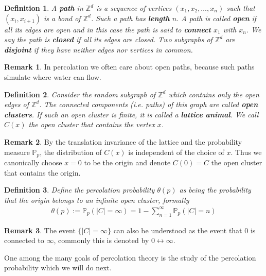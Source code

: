 \documentclass[12pt,a4paper]{article}
\newtheorem{defn}{Definition}[section]
\theoremstyle{definition}
\newtheorem{rem}{Remark}[section]
\begin{document}
\begin{defn} A \textbf{path} in $\mathbb{Z}^d$ is a sequence of vertices $(x_1, x_2, \dots , x_n)$ such that $(x_i,x_{i+1})$ is a bond of $\mathbb{Z}^d$. Such a path has \textbf{length} $n$. A path is called \textbf{open} if all its edges are open and in this case the path is said to \textbf{connect} $x_1$ with $x_n$. We say the path is \textbf{closed} if all its edges are closed. Two subgraphs of $\mathbb{Z}^d$ are \textbf{disjoint} if they have neither edges nor vertices in common.
\end{defn}
\begin{rem} In percolation we often care about open paths, because such paths simulate where water can flow. 
\end{rem}
\begin{defn} Consider the random subgraph of $\mathbb{Z}^d$ which contains only the open edges of $\mathbb{Z}^d$. The connected components (i.e. paths) of this graph are called \textbf{open clusters}. If such an open cluster is finite, it is called a \textbf{lattice animal}. We call $C(x)$ the open cluster that contains the vertex $x$. 
\end{defn}
\begin{rem}By the translation invariance of the lattice and the probability
measure $\mathbb{P}_p$, the distribution of $C(x)$ is independent of the choice of $x$. Thus we canonically choose $x=0$ to be the origin and denote $C(0)=C$ the open cluster that contains the origin. 
\end{rem}
\begin{defn} Define the percolation probability $\theta(p)$ as being the probability that the origin belongs to an infinite open cluster, formally 
\begin{align*}
\theta(p):= \mathbb{P}_p( |C| = \infty) = 1 - \sum_{n=1}^\infty \mathbb{P}_p(|C|=n)
\end{align*}
\end{defn}
\begin{rem} The event $\{ |C| = \infty \}$ can also be understood as the event that $0$ is connected to $\infty$, commonly this is denoted by $0 \longleftrightarrow \infty$. 
\end{rem}
One among the many goals of percolation theory is the study of the percolation probability which we will do next. 
\newpage 
\end{document}

